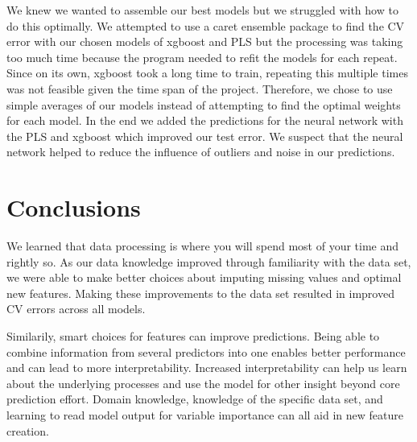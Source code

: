 \documentclass[12pt]{article}
\begin{document}
We knew we wanted to assemble our best models but we struggled with how to do this optimally.  We attempted to use a caret ensemble package to find the CV error with our chosen models of xgboost and PLS but the processing was taking too much time because the program needed to refit the models for each repeat.  Since on its own, xgboost took a long time to train, repeating this multiple times was not feasible given the time span of the project.  Therefore, we chose to use simple averages of our models instead of attempting to find the optimal weights for each model.  In the end we added the predictions for the neural network with the PLS and xgboost which improved our test error.  We suspect that the neural network helped to reduce the influence of outliers and noise in our predictions.



\section{Conclusions}

We learned that data processing is where you will spend most of your time and rightly so.  As our data knowledge improved through familiarity with the data set, we were able to make better choices about imputing missing values and optimal new features.  Making these improvements to the data set resulted in improved CV errors across all models.

Similarily, smart choices for features can improve predictions.  Being able to combine information from several predictors into one enables better performance and can lead to more interpretability.  Increased interpretability can help us learn about the underlying processes and use the model for other insight beyond core prediction effort.  Domain knowledge, knowledge of the specific data set, and learning to read model output for variable importance can all aid in new feature creation.

\end{document}
